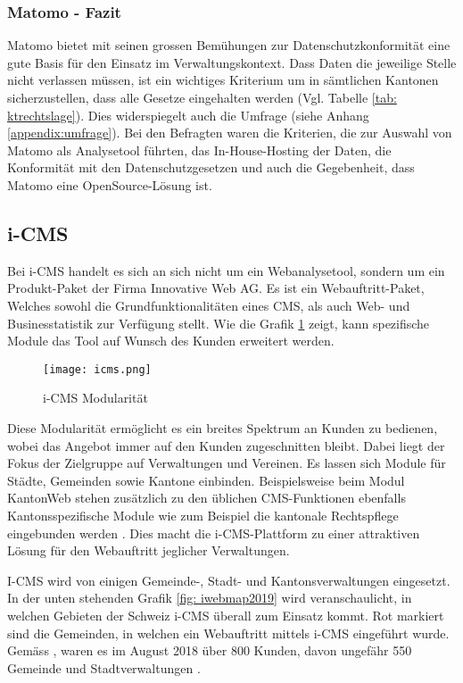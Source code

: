 \subsubsection{Matomo - Fazit}

Matomo bietet mit seinen grossen Bemühungen zur Datenschutzkonformität eine gute Basis für den Einsatz im Verwaltungskontext. Dass Daten die jeweilige Stelle nicht verlassen müssen, ist ein wichtiges Kriterium um in sämtlichen Kantonen sicherzustellen, dass alle Gesetze eingehalten werden (Vgl. Tabelle \ref{tab: ktrechtslage}). Dies widerspiegelt auch die Umfrage (siehe Anhang \ref{appendix:umfrage}). Bei den Befragten waren die Kriterien, die zur Auswahl von Matomo als Analysetool führten, das In-House-Hosting der Daten, die Konformität mit den Datenschutzgesetzen und auch die Gegebenheit, dass Matomo eine OpenSource-Lösung ist.  

\subsection{i-CMS}
Bei i-CMS handelt es sich an sich nicht um ein Webanalysetool, sondern um ein Produkt-Paket der Firma Innovative Web AG. Es ist ein Webauftritt-Paket, Welches sowohl die Grundfunktionalitäten eines CMS, als auch Web- und Businesstatistik zur Verfügung stellt\parencite{iwebwebsiteCMS}. Wie die Grafik \ref{fig: icms} zeigt, kann spezifische Module das Tool auf Wunsch des Kunden erweitert werden.


\begin{figure}[h]
  \centering
  \texttt{[image: icms.png]}
  \caption{i-CMS Modularität \parencite{iweb2019revue}}
  \label{fig: icms}
\end{figure}

Diese Modularität ermöglicht es ein breites Spektrum an Kunden zu bedienen, wobei das Angebot immer auf den Kunden zugeschnitten bleibt. Dabei liegt der Fokus der Zielgruppe auf Verwaltungen und Vereinen. Es lassen sich Module für Städte, Gemeinden sowie Kantone einbinden. Beispielsweise beim Modul KantonWeb stehen zusätzlich zu den üblichen CMS-Funktionen ebenfalls Kantonsspezifische Module wie zum Beispiel die kantonale Rechtspflege eingebunden werden \parencite{iwebwebsiteKanotonWeb}. Dies macht die i-CMS-Plattform zu einer attraktiven Lösung für den Webauftritt jeglicher Verwaltungen. 

I-CMS wird von einigen Gemeinde-, Stadt- und Kantonsverwaltungen eingesetzt. In der unten stehenden Grafik \ref{fig: iwebmap2019} wird veranschaulicht, in welchen Gebieten der Schweiz i-CMS überall zum Einsatz kommt. Rot markiert sind die Gemeinden, in welchen ein Webauftritt mittels i-CMS eingeführt wurde. Gemäss \parencite[S. 14]{iweb2018revue}, waren es im August 2018 über 800 Kunden, davon ungefähr 550 Gemeinde und Stadtverwaltungen \parencite{iwebwebsiteGemeindeWeb}.

